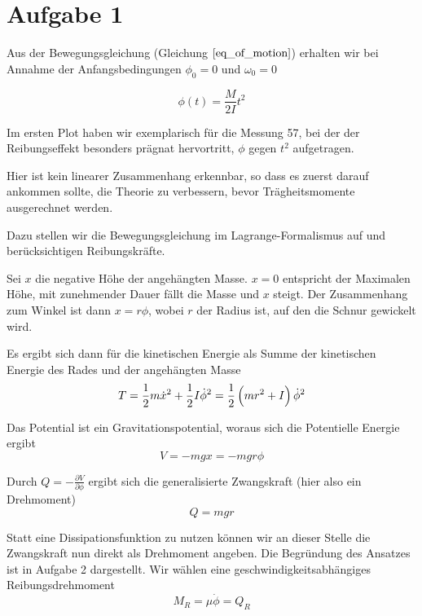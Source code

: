 \documentclass[a4paper,german,12pt,smallheadings]{scrartcl}
\begin{document}
\section*{Aufgabe 1}
Aus der Bewegungsgleichung (Gleichung $\ref{eq_of_motion}$) erhalten wir bei
Annahme der Anfangsbedingungen $\phi_0 = 0$ und $\omega_0 = 0$

\begin{equation}
  \phi(t) = \frac{M}{2I} t^2
\end{equation}

Im ersten Plot haben wir exemplarisch für die Messung 57, bei der der Reibungseffekt
besonders prägnat hervortritt, $\phi$ gegen $t^2$ aufgetragen.

Hier ist kein linearer Zusammenhang erkennbar, so dass es zuerst darauf
ankommen sollte, die Theorie zu verbessern, bevor Trägheitsmomente ausgerechnet
werden.

Dazu stellen wir die Bewegungsgleichung im Lagrange-Formalismus auf und
berücksichtigen Reibungskräfte.

Sei $x$ die negative Höhe der angehängten Masse. $x=0$ entspricht der Maximalen
Höhe, mit zunehmender Dauer fällt die Masse und $x$ steigt. Der Zusammenhang
zum Winkel ist dann $x = r \phi$, wobei $r$ der Radius ist, auf den die Schnur
gewickelt wird.

Es ergibt sich dann für die kinetischen Energie als Summe der kinetischen
Energie des Rades und der angehängten Masse
\begin{equation}
  T = \frac{1}{2} m \dot{x}^2 + \frac{1}{2} I \dot{\phi}^2 = \frac{1}{2} \del{m r^2 + I} \dot{\phi}^2
\end{equation}

Das Potential ist ein Gravitationspotential, woraus sich die Potentielle Energie ergibt
\begin{equation}
  V = -mgx = -mgr \phi
\end{equation}

Durch $Q = -\frac{\partial V}{\partial \phi}$ ergibt sich die generalisierte
Zwangskraft (hier also ein Drehmoment)
\begin{equation}
  Q = mgr
\end{equation}

Statt eine Dissipationsfunktion zu nutzen können wir an dieser Stelle die
Zwangskraft nun direkt als Drehmoment angeben. Die Begründung des Ansatzes ist
in Aufgabe 2 dargestellt. %
Wir wählen eine geschwindigkeitsabhängiges Reibungsdrehmoment
\begin{equation}
  M_R = \mu \dot{\phi} = Q_R
\end{equation}
\end{document}
